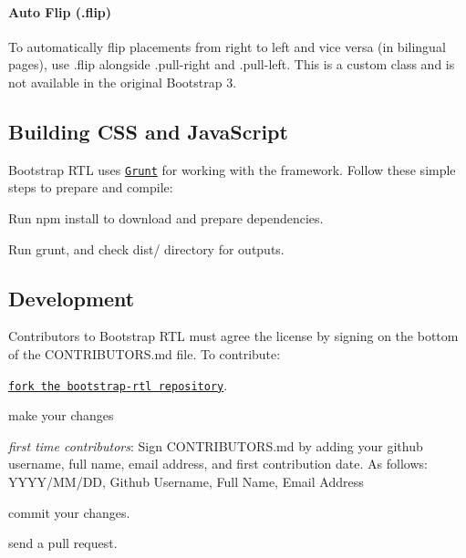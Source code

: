 \paragraph*{Auto Flip ({\ttfamily .flip})}

To automatically flip placements from right to left and vice versa (in bilingual pages), use {\ttfamily .flip} alongside {\ttfamily .pull-\/right} and {\ttfamily .pull-\/left}. This is a custom class and is not available in the original Bootstrap 3.

\subsection*{Building C\+SS and Java\+Script}

Bootstrap R\+TL uses \href{http://gruntjs.com/}{\tt Grunt} for working with the framework. Follow these simple steps to prepare and compile\+:


\begin{DoxyEnumerate}
\item Run {\ttfamily npm install} to download and prepare dependencies.
\item Run {\ttfamily grunt}, and check {\ttfamily dist/} directory for outputs.
\end{DoxyEnumerate}

\subsection*{Development}

Contributors to Bootstrap R\+TL must agree the license by signing on the bottom of the {\ttfamily C\+O\+N\+T\+R\+I\+B\+U\+T\+O\+R\+S.\+md} file. To contribute\+:


\begin{DoxyItemize}
\item \href{https://github.com/morteza/bootstrap-rtl/fork}{\tt fork the bootstrap-\/rtl repository}.
\item make your changes
\item {\itshape first time contributors}\+: Sign {\ttfamily C\+O\+N\+T\+R\+I\+B\+U\+T\+O\+R\+S.\+md} by adding your github username, full name, email address, and first contribution date. As follows\+: {\ttfamily Y\+Y\+Y\+Y/\+M\+M/\+DD, Github Username, Full Name, Email Address}
\item commit your changes.
\item send a pull request.
\end{DoxyItemize}


